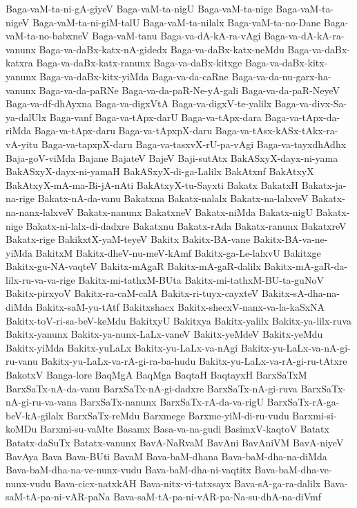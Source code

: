 {Baga-vaM-ta-ni-gA-giyeV
Baga-vaM-ta-nigU
Baga-vaM-ta-nige
Baga-vaM-ta-nigeV
Baga-vaM-ta-ni-giM-talU
Baga-vaM-ta-nilalx
Baga-vaM-ta-no-Dane
Baga-vaM-ta-no-babxneV
Baga-vaM-tanu
Baga-va-dA-kA-ra-vAgi
Baga-va-dA-kA-ra-vanunx
Baga-va-daBx-katx-nA-gidedx
Baga-va-daBx-katx-neMdu
Baga-va-daBx-katxra
Baga-va-daBx-katx-ranunx
Baga-va-daBx-kitxge
Baga-va-daBx-kitx-yanunx
Baga-va-daBx-kitx-yiMda
Baga-va-da-caRne
Baga-va-da-nu-garx-ha-vanunx
Baga-va-da-paRNe
Baga-va-da-paR-Ne-yA-gali
Baga-va-da-paR-NeyeV
Baga-va-df-dhAyxna
Baga-va-digxVtA
Baga-va-digxV-te-yalilx
Baga-va-divx-Sa-ya-dalUlx
Baga-vanf
Baga-va-tApx-darU
Baga-va-tApx-dara
Baga-va-tApx-da-riMda
Baga-va-tApx-daru
Baga-va-tApxpX-daru
Baga-va-tAsx-kASx-tAkx-ra-vA-yitu
Baga-va-tapxpX-daru
Baga-va-tasxvX-rU-pa-vAgi
Baga-va-tayxdhAdhx
Baja-goV-viMda
Bajane
BajateV
BajeV
Baji-sutAtx
BakASxyX-dayx-ni-yama
BakASxyX-dayx-ni-yamaH
BakASxyX-di-ga-Lalilx
BakAtxnf
BakAtxyX
BakAtxyX-mA-ma-Bi-jA-nAti
BakAtxyX-tu-Sayxti
Bakatx
BakatxH
Bakatx-ja-na-rige
Bakatx-nA-da-vanu
Bakatxna
Bakatx-nalalx
Bakatx-na-lalxveV
Bakatx-na-nanx-lalxveV
Bakatx-nanunx
BakatxneV
Bakatx-niMda
Bakatx-nigU
Bakatx-nige
Bakatx-ni-lalx-di-dadxre
Bakatxnu
Bakatx-rAda
Bakatx-ranunx
BakatxreV
Bakatx-rige
BakikxtX-yaM-teyeV
Bakitx
Bakitx-BA-vane
Bakitx-BA-va-ne-yiMda
BakitxM
Bakitx-dheV-nu-meV-kAmf
Bakitx-ga-Le-lalxvU
Bakitxge
Bakitx-gu-NA-vaqteV
Bakitx-mAgaR
Bakitx-mA-gaR-dalilx
Bakitx-mA-gaR-da-lilx-ru-va-va-rige
Bakitx-mi-tathxM-BUta
Bakitx-mi-tathxM-BU-ta-guNoV
Bakitx-pirxyoV
Bakitx-ra-caM-calA
Bakitx-ri-tuyx-cayxteV
Bakitx-sA-dha-na-diMda
Bakitx-saM-yu-tAtf
Bakitxshacx
Bakitx-shecxV-nanx-va-la-kaSxNA
Bakitx-toV-ri-sa-beV-keMdu
BakitxyU
Bakitxya
Bakitx-yalilx
Bakitx-ya-lilx-ruva
Bakitx-yanunx
Bakitx-ya-nunx-LaLx-vaneV
Bakitx-yeMdeV
Bakitx-yeMdu
Bakitx-yiMda
Bakitx-yuLaLx
Bakitx-yu-LaLx-va-nAgi
Bakitx-yu-LaLx-va-nA-gi-ru-vanu
Bakitx-yu-LaLx-va-rA-gi-ra-ba-hudu
Bakitx-yu-LaLx-va-rA-gi-ru-tAtxre
BakotxV
Banga-lore
BaqMgA
BaqMga
BaqtaH
BaqtayxH
BarxSaTxM
BarxSaTx-nA-da-vanu
BarxSaTx-nA-gi-dadxre
BarxSaTx-nA-gi-ruva
BarxSaTx-nA-gi-ru-va-vana
BarxSaTx-nanunx
BarxSaTx-rA-da-va-rigU
BarxSaTx-rA-ga-beV-kA-gilalx
BarxSaTx-reMdu
Barxmege
Barxme-yiM-di-ru-vudu
Barxmi-si-koMDu
Barxmi-su-vaMte
Basamx
Basa-va-na-gudi
BasimxV-kaqtoV
Batatx
Batatx-daSuTx
Batatx-vanunx
BavA-NaRvaM
BavAni
BavAniVM
BavA-niyeV
BavAya
Bava
Bava-BUti
BavaM
Bava-baM-dhana
Bava-baM-dha-na-diMda
Bava-baM-dha-na-ve-nunx-vudu
Bava-baM-dha-ni-vaqtitx
Bava-baM-dha-ve-nunx-vudu
Bava-cicx-natxkAH
Bava-nitx-vi-tatxsayx
Bava-sA-ga-ra-dalilx
Bava-saM-tA-pa-ni-vAR-paNa
Bava-saM-tA-pa-ni-vAR-pa-Na-su-dhA-na-diVmf
}
